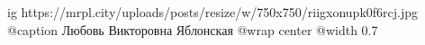  
 
 
 
 

\ifcmt
  ig https://mrpl.city/uploads/posts/resize/w/750x750/riigxonupk0f6rcj.jpg
	@caption Любовь Викторовна Яблонская
  @wrap center
  @width 0.7
\fi

